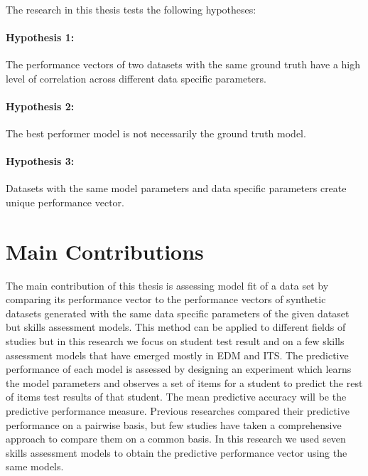 \paragraph{}The research in this thesis tests the following hypotheses:
\paragraph{Hypothesis 1:} The performance vectors of two datasets with the same ground truth have a high level of correlation across different data specific parameters. 
\paragraph{Hypothesis 2:} The best performer model is not necessarily the ground truth model.
\paragraph{Hypothesis 3:} Datasets with the same model parameters and data specific parameters create unique performance vector. 

\section{Main Contributions}

The main contribution of this thesis is assessing model fit of a data set by comparing its performance vector to the performance vectors of synthetic datasets generated with the same data specific parameters of the given dataset but skills assessment models. This method can be applied to different fields of studies but in this research we focus on student test result and on a few skills assessment models that have emerged mostly in EDM and ITS. The predictive performance of each model is assessed by designing an experiment which learns the model parameters and observes a set of items for a student to predict the rest of items test results of that student. The mean predictive accuracy will be the predictive performance measure. Previous researches compared their predictive performance  on a pairwise basis, but few studies have taken a comprehensive approach to compare them on a common basis. In this research we used seven skills assessment models to obtain the predictive performance vector using the same models. 

